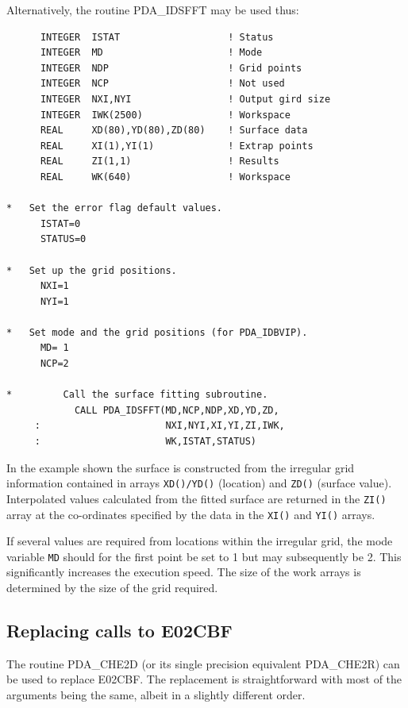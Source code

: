 \documentclass[11pt,twoside]{article}
\newcommand{\xlabel}[1]{}
\begin{document}
Alternatively, the routine PDA\_IDSFFT may be used thus:

\begin{verbatim}
      INTEGER  ISTAT                   ! Status
      INTEGER  MD                      ! Mode
      INTEGER  NDP                     ! Grid points
      INTEGER  NCP                     ! Not used
      INTEGER  NXI,NYI                 ! Output gird size
      INTEGER  IWK(2500)               ! Workspace    
      REAL     XD(80),YD(80),ZD(80)    ! Surface data
      REAL     XI(1),YI(1)             ! Extrap points
      REAL     ZI(1,1)                 ! Results 
      REAL     WK(640)                 ! Workspace

*   Set the error flag default values.
      ISTAT=0
      STATUS=0
 
*   Set up the grid positions.
      NXI=1
      NYI=1             

*   Set mode and the grid positions (for PDA_IDBVIP).
      MD= 1
      NCP=2

*         Call the surface fitting subroutine.
            CALL PDA_IDSFFT(MD,NCP,NDP,XD,YD,ZD,
     :                      NXI,NYI,XI,YI,ZI,IWK, 
     :                      WK,ISTAT,STATUS)
\end{verbatim} 

In the example shown the surface is constructed from the irregular grid 
information contained in arrays {\tt XD()/YD()} (location) and 
{\tt ZD()} (surface value). Interpolated values calculated from the 
fitted surface are returned in the {\tt ZI()} array at the co-ordinates 
specified by the data in the {\tt XI()} and {\tt YI()} arrays.

If several values are required from locations within the 
irregular grid, the mode variable {\tt MD} should for the first
point be set to 1 but may subsequently be 2. This
significantly increases the execution speed. The size of the work 
arrays is determined by the size of the grid required. 

\subsection{\xlabel{replacing_calls_to_e02cbf}Replacing calls to E02CBF}
The routine PDA\_CHE2D (or its single precision equivalent PDA\_CHE2R)
can be used to replace E02CBF. The replacement is straightforward with most 
of the arguments being the same, albeit in a slightly different order.

\end{document}
